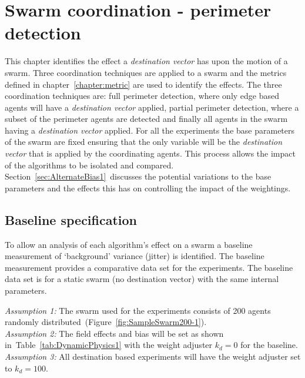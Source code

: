 \chapter{Swarm coordination - perimeter detection}\label{chapter:coordination}
This chapter identifies the effect a \textit{destination vector} has upon the motion of a swarm. Three coordination techniques are applied to a swarm and the metrics defined in chapter~\ref{chapter:metric} are used to identify the effects. The three coordination techniques are: full perimeter detection, where only edge based agents will have a \textit{destination vector} applied, partial perimeter detection, where a subset of the perimeter agents are detected and finally all agents in the swarm having a \textit{destination vector} applied. For all the experiments the base parameters of the swarm are fixed ensuring that the only variable will be the \textit{destination vector} that is applied by the coordinating agents. This process allows the impact of the algorithms to be isolated and compared. Section~\ref{sec:AlternateBias1}~discusses the potential variations to the base parameters and the effects this has on controlling the impact of the weightings.

\section{Baseline specification}
To allow an analysis of each algorithm's effect on a swarm a baseline measurement of `background' variance (jitter) is identified. The baseline measurement provides a comparative data set for the experiments. The baseline data set is for a static swarm (no destination vector) with the same internal parameters.

\textit{Assumption 1:} The swarm used for the experiments consists of 200 agents randomly distributed~(Figure~\ref{fig:SampleSwarm200-1}).\\ 
\textit{Assumption 2:} The field effects and bias will be set as shown in~Table~\ref{tab:DynamicPhysics1} with the weight adjuster $k_d = 0$ for the baseline.\\
\textit{Assumption 3:} All destination based experiments will have the weight adjuster set to $k_d = 100$.

